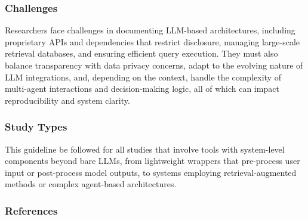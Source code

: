 \subsubsection{Challenges}

Researchers face challenges in documenting LLM-based architectures, including proprietary APIs and dependencies that restrict disclosure, managing large-scale retrieval databases, and ensuring efficient query execution. They must also balance transparency with data privacy concerns, adapt to the evolving nature of LLM integrations, and, depending on the context, handle the complexity of multi-agent interactions and decision-making logic, all of which can impact reproducibility and system clarity.

\subsubsection{Study Types}

This guideline \must be followed for all studies that involve tools with system-level components beyond bare LLMs, from lightweight wrappers that pre-process user input or post-process model outputs, to systems employing retrieval-augmented methods or complex agent-based architectures.

\subsubsection{References}






